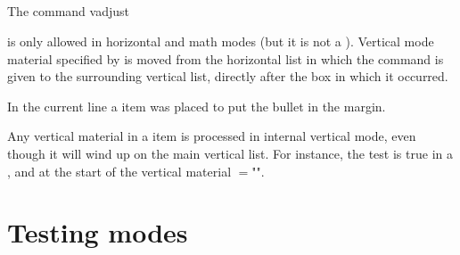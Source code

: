 \documentclass{book}
\begin{document}
\subsection{}

The command
\cstoidx vadjust\par
\begin{disp}\lb{}\rb\end{disp}
is only allowed in horizontal and math modes (but it is
not a ).
Vertical mode material specified by  is moved from
the horizontal list in which the command is given
to the surrounding vertical list, directly after the box
in which it occurred.

In the current line
a  item was placed to put the bullet in the margin.


Any vertical material in a  item is processed
in internal vertical mode, even though it will wind up
on the main vertical list. For instance, the 
test is true in a , and at the start
\mdqon
of the vertical material $=$""\n{-1000pt}.
\mdqoff

\section{Testing modes}
\end{document}
